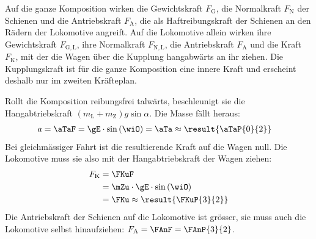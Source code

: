 \begin{abcliste}
\begin{center}
\end{center}
Auf die ganze Komposition wirken die Gewichtskraft $F_\mathrm{G}$, die Normalkraft $F_\mathrm{N}$ der Schienen und die Antriebskraft $F_\mathrm{A}$, die als Haftreibungskraft der Schienen an den Rädern der Lokomotive angreift. Auf die Lokomotive allein wirken ihre Gewichtskraft $F_\mathrm{G,L}$, ihre Normalkraft $F_\mathrm{N,L}$, die Antriebskraft $F_\mathrm{A}$ und die Kraft $F_\mathrm{K}$, mit der die Wagen über die Kupplung hangabwärts an ihr ziehen. Die Kupplungskraft ist für die ganze Komposition eine innere Kraft und erscheint deshalb nur im zweiten Kräfteplan.

\abc Rollt die Komposition reibungsfrei talwärts, beschleunigt sie die Hangabtriebskraft $\left(m_\mathrm{L}+m_\mathrm{Z}\right)g\sin\alpha$. Die Masse fällt heraus:
\begin{align}
 a &= \aTaF = \gE\cdot\sin\left(\wiO\right) = \aTa \approx \result{\aTaP{0}{2}}
\end{align}
Bei gleichmässiger Fahrt ist die resultierende Kraft auf die Wagen null. Die Lokomotive muss sie also mit der Hangabtriebskraft der Wagen ziehen:
\begin{align}
 F_\mathrm{K} &= \FKuF \\
   &= \mZu\cdot\gE\cdot\sin\left(\wiO\right) \\
   &= \FKu \approx \result{\FKuP{3}{2}}
\end{align}
Die Antriebskraft der Schienen auf die Lokomotive ist grösser, sie muss auch die Lokomotive selbst hinaufziehen: $F_\mathrm{A} = \FAnF = \FAnP{3}{2}$.
\end{abcliste}
